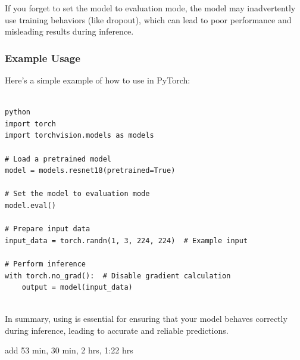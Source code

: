 \begin{botresponse}
If you forget to set the model to evaluation mode, the model may inadvertently use training behaviors (like dropout), which can lead to poor performance and misleading results during inference.

\subsubsection{Example Usage}

Here’s a simple example of how to use  in PyTorch:

\begin{lstlisting}[breaklines=true, breakatwhitespace=false]

python
import torch
import torchvision.models as models

# Load a pretrained model
model = models.resnet18(pretrained=True)

# Set the model to evaluation mode
model.eval()

# Prepare input data
input_data = torch.randn(1, 3, 224, 224)  # Example input

# Perform inference
with torch.no_grad():  # Disable gradient calculation
    output = model(input_data)


\end{lstlisting}

In summary, using  is essential for ensuring that your model behaves correctly during inference, leading to accurate and reliable predictions.

\end{botresponse}

\begin{userprompt}

add 53 min, 30 min, 2 hrs, 1:22 hrs

\end{userprompt}

